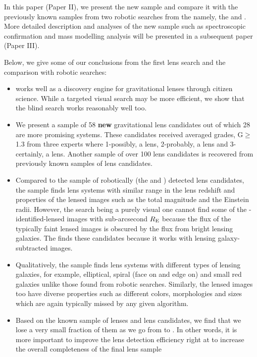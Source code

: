 \documentclass[useAMS,usenatbib,a4paper]{mn2e}
\begin{document}
In this paper (Paper II), we present the new \sw sample and compare it
with the previously known samples from two robotic searches from the
\cfhtls namely, the \rf and \af. More detailed description and analyses
of the new sample such as spectroscopic confirmation and mass modelling
analysis will be presented in a subsequent \sw paper (Paper III).

Below, we give some of our conclusions from the first \sw lens search
and the comparison with robotic searches:
\begin{itemize}

\item \sw works well as a discovery engine for gravitational lenses
through citizen science. While a targeted visual search may be more
efficient, we show that the blind search works reasonably well too.

\item We present a sample of 58 {\bf new} gravitational lens candidates
out of which 28 are more promising systems. These candidates received
averaged grades, G$\ge$1.3 from three experts where 1-possibly, a lens,
2-probably, a lens and 3-certainly, a lens. Another sample of over 100
lens candidates is recovered from previously known samples of lens
candidates.

\item Compared to the sample of robotically (the \rf and \af) detected
lens candidates, the \sw sample finds lens systems with similar range in
the lens redshift and properties of the lensed images such as the total
magnitude and the Einstein radii. However, the \sw search being a purely
visual one cannot find some of the \rf-identified-lensed images with
sub-arcsecond $R_{\rm E}$ because the flux of the typically faint
lensed images is obscured by the flux from bright lensing galaxies. The
\rf finds these candidates because it works with lensing
galaxy-subtracted images.

\item Qualitatively, the \sw sample finds lens systems with different
types of lensing galaxies, for example, elliptical, spiral (face on and
edge on) and small red galaxies unlike those found from robotic
searches. Similarly, the lensed images too have diverse properties such
as different colors, morphologies and sizes which are again typically
missed by any given algorithm.

\item Based on the known sample of lenses and lens candidates, we find
that we lose a very small fraction of them as we go from \StageOne to
\StageTwo. In other words, it is more important to improve the lens
detection efficiency right at \StageOne to increase the overall
completeness of the final lens sample


\end{itemize}
\end{document}
